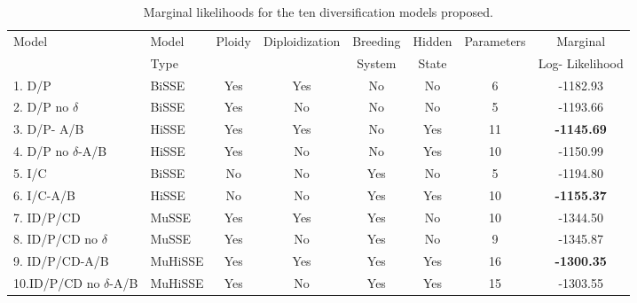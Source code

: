 

\begin{table}
\begin{tabular}{@{}llcccccc@{}} \toprule
Model& Model& Ploidy & Diploidization & Breeding  & Hidden & Parameters & Marginal \\
& Type & &  &System & State & & Log- Likelihood \\
1. D/P &BiSSE &	Yes  &	Yes &	No	&No	& 6	& -1182.93 \\
2. D/P no $\delta$ & BiSSE  &	Yes & 	No	& No	& No & 	5 &	-1193.66\\
3. D/P- A/B  & HiSSE &	Yes &	Yes	&No &	Yes &	11 &	\textbf{-1145.69}\\
4. D/P no $\delta$-A/B &	HiSSE &	Yes & No &	No &	Yes &	10	&-1150.99\\
5. I/C &	BiSSE &	No &	 No	&Yes &	No &	 5 &  -1194.80 \\
6. I/C-A/B &	HiSSE &	No &	 No	&Yes &	Yes	& 10 & \textbf{-1155.37}\\
7. ID/P/CD & MuSSE &	Yes & 	Yes &	Yes &	No &	10 & -1344.50\\
8. ID/P/CD no $\delta$ &	MuSSE &	Yes & 	No &	Yes	&No &	9 &-1345.87\\
9. ID/P/CD-A/B & MuHiSSE &	Yes 	&Yes &	Yes &	Yes &	16 & \textbf{-1300.35} \\
10.ID/P/CD no $\delta$-A/B &	 MuHiSSE	 & Yes & 	No	&Yes &	Yes	&15 &-1303.55 \\ \bottomrule
\end{tabular}
\caption{Marginal likelihoods for the ten diversification models proposed.}
\label{table:marginallike}
\end{table}

